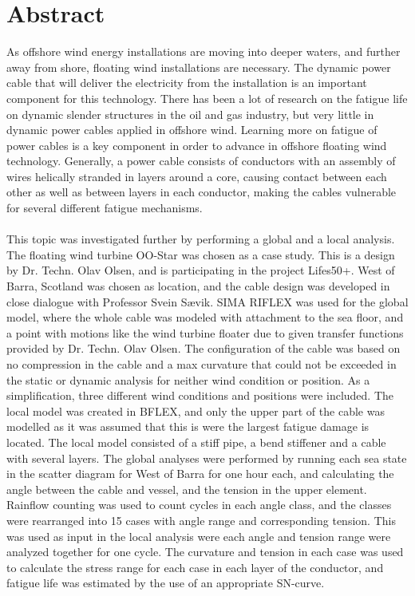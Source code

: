 \chapter*{Abstract}

As offshore wind energy installations are moving into deeper waters, and further away from shore, floating wind installations are necessary. The dynamic power cable that will deliver the electricity from the installation is an important component for this technology. There has been a lot of research on the fatigue life on dynamic slender structures in the oil and gas industry, but very little in dynamic power cables applied in offshore wind. Learning more on fatigue of power cables is a key component in order to advance in offshore floating wind technology. Generally, a power cable consists of conductors with an assembly of wires helically stranded in layers around a core, causing contact between each other as well as between layers in each conductor, making the cables vulnerable for several different fatigue mechanisms.\\\\ This topic was investigated further by performing a global and a local analysis. The floating wind turbine OO-Star was chosen as a case study. This is a design by Dr. Techn. Olav Olsen, and is participating in the project Lifes50+. West of Barra, Scotland was chosen as location, and the cable design was developed in close dialogue with Professor Svein Sævik. SIMA RIFLEX was used for the global model, where the whole cable was modeled with attachment to the sea floor, and a point with motions like the wind turbine floater due to given transfer functions provided by Dr. Techn. Olav Olsen. The configuration of the cable was based on no compression in the cable and a max curvature that could not be exceeded in the static or dynamic analysis for neither wind condition or position. As a simplification, three different wind conditions and positions were included. The local model was created in BFLEX, and only the upper part of the cable was modelled as it was assumed that this is were the largest fatigue damage is located. The local model consisted of a stiff pipe, a bend stiffener and a cable with several layers. \newline 
\newline
The global analyses were performed by running each sea state in the scatter diagram for West of Barra for one hour each, and calculating the angle between the cable and vessel, and the tension in the upper element. Rainflow counting was used to count cycles in each angle class, and the classes were rearranged into 15 cases with angle range and corresponding tension. This was used as input in the local analysis were each angle and tension range were analyzed together for one cycle. The curvature and tension in each case was used to calculate the stress range for each case in each layer of the conductor, and fatigue life was estimated by the use of an appropriate SN-curve.  \\\\
